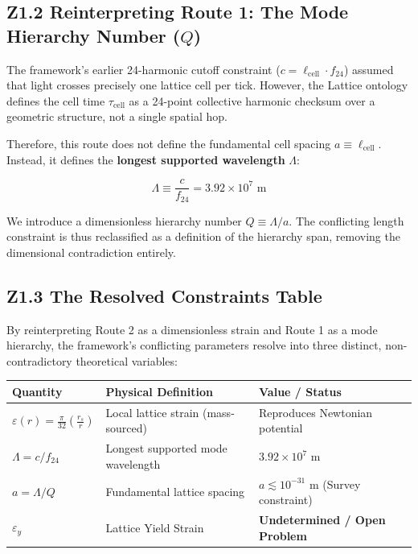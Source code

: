 \documentclass[11pt, letterpaper, openany]{book}
\begin{document}
\subsection*{Z1.2 Reinterpreting Route 1: The Mode Hierarchy Number ($Q$)}

The framework's earlier 24-harmonic cutoff constraint ($c = \ell_{\text{cell}} \cdot f_{24}$) assumed that light crosses precisely one lattice cell per tick. However, the Lattice ontology defines the cell time $\tau_{\text{cell}}$ as a 24-point collective harmonic checksum over a geometric structure, not a single spatial hop. 

Therefore, this route does not define the fundamental cell spacing $a \equiv \ell_{\text{cell}}$. Instead, it defines the \textbf{longest supported wavelength} $\Lambda$:

\[
\Lambda \equiv \frac{c}{f_{24}} = 3.92 \times 10^7 \text{ m}
\]

We introduce a dimensionless hierarchy number $Q \equiv \Lambda / a$. The conflicting length constraint is thus reclassified as a definition of the hierarchy span, removing the dimensional contradiction entirely.

\subsection*{Z1.3 The Resolved Constraints Table}

By reinterpreting Route 2 as a dimensionless strain and Route 1 as a mode hierarchy, the framework's conflicting parameters resolve into three distinct, non-contradictory theoretical variables:

\vspace{0.3cm}
\begin{center}
\renewcommand{\arraystretch}{1.5}
\begin{tabular}{|l|l|l|}
\hline
\rowcolor{kishblue!12}
\textbf{Quantity} & \textbf{Physical Definition} & \textbf{Value / Status} \\
\hline
$\varepsilon(r) = \frac{\pi}{32} \left(\frac{r_s}{r}\right)$ & Local lattice strain (mass-sourced) & Reproduces Newtonian potential \\
\hline
$\Lambda = c/f_{24}$ & Longest supported mode wavelength & $3.92 \times 10^7$ m \\
\hline
$a = \Lambda/Q$ & Fundamental lattice spacing & $a \lesssim 10^{-31}$ m (Survey constraint) \\
\hline
$\varepsilon_y$ & Lattice Yield Strain & \textbf{Undetermined / Open Problem} \\
\hline
\end{tabular}
\end{center}
\vspace{0.3cm}
\end{document}
